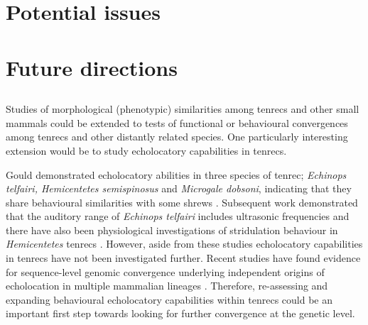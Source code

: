 \section{Potential issues}

\section{Future directions}





\subsection{}
	Studies of morphological (phenotypic) similarities among tenrecs and other small mammals could be extended to tests of functional or behavioural convergences among tenrecs and other distantly related species.
	One particularly interesting extension would be to study echolocatory capabilities in tenrecs.

	Gould \citeyear{Gould1965} demonstrated echolocatory abilities in three species of tenrec; \textit{Echinops telfairi, Hemicentetes semispinosus} and \textit{Microgale dobsoni}, indicating that they share behavioural similarities with some shrews \citep{Gould1964, Tomasi1979, Siemers2009}. Subsequent work demonstrated that the auditory range of \textit{Echinops telfairi} includes ultrasonic frequencies \citep{Drexl2003} and there have also been physiological investigations of stridulation behaviour in \textit{Hemicentetes} tenrecs \citep{Eisenberg1969, Endo2010}. However, aside from these studies echolocatory capabilities in tenrecs have not been investigated further. Recent studies have found evidence for sequence-level genomic convergence underlying independent origins of echolocation in multiple mammalian lineages \citep{Parker2013}. Therefore, re-assessing and expanding behavioural echolocatory capabilities within tenrecs could be an important first step towards looking for further convergence at the genetic level.

